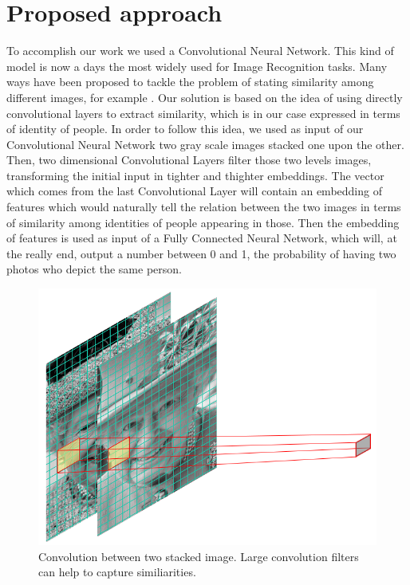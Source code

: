 \section{Proposed approach}
To accomplish our work we used a Convolutional Neural Network. This kind of model is now a days the most widely used for Image Recognition tasks. Many ways have been proposed to tackle the problem of stating similarity among different images, for example . Our solution is based on the idea of using directly convolutional layers to extract similarity, which is in our case expressed in terms of identity of people. In order to follow this idea, we used as input of our Convolutional Neural Network two gray scale images stacked one upon the other. Then, two dimensional Convolutional Layers filter those two levels images, transforming the initial input in tighter and thighter embeddings. The vector which comes from the last Convolutional Layer will contain an embedding of features which would naturally tell the relation between the two images in terms of similarity among identities of people appearing in those. Then the embedding of features is used as input of a Fully Connected Neural Network, which will, at the really end, output a number between 0 and 1, \ie the probability of having two photos who depict the same person.

\begin{figure}[t]
\includegraphics[width=0.8\linewidth]{images/stackedconvolution.png}
   \caption{Convolution between two stacked image. Large convolution filters can help to capture similiarities.}
\label{fig:long}
\label{fig:onecol}
\end{figure}

